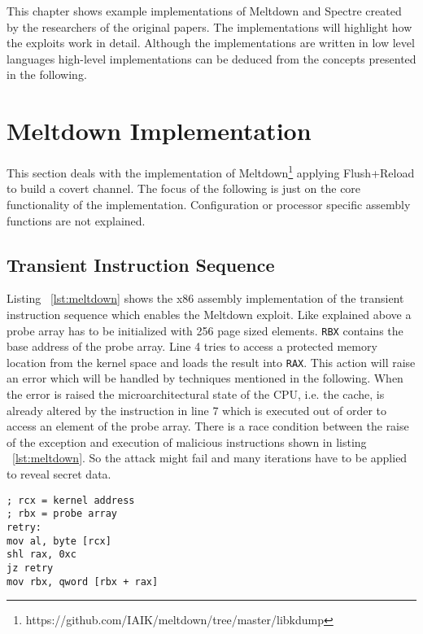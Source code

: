 \documentclass[a4paper,oneside,openright] {scrreprt}
\begin{document}
This chapter shows example implementations of Meltdown and Spectre created by the researchers of the original papers.
The implementations will highlight how the exploits work in detail. Although the implementations are written in low level languages 
high-level implementations can be deduced from the concepts presented in the following.

\section{Meltdown Implementation}
\label{ch:intro:motivation}

This section deals with the implementation of Meltdown\footnote{https://github.com/IAIK/meltdown/tree/master/libkdump} applying
Flush+Reload to build a covert channel. The focus of the following is just on the core functionality of the implementation.
Configuration or processor specific assembly functions are not explained.

\subsection{Transient Instruction Sequence}
\label{ch:TransientInstructionSequence}

Listing ~\ref{lst:meltdown} shows the x86 assembly implementation of the transient instruction sequence
which enables the Meltdown exploit.
Like explained above a probe array has to be initialized with 256 page sized elements.
\texttt{RBX} contains the base address of the probe array.
Line 4 tries to access a protected memory location from the kernel space and loads the result into \texttt{RAX}. 
This action will raise an error which will be handled by techniques mentioned in the following.
When the error is raised the microarchitectural state of the CPU, i.e. the cache, is already altered 
by the instruction in line 7 which is executed out of order to access an element of the probe array.
There is a race condition between the raise of the exception and execution of malicious instructions shown in listing ~\ref{lst:meltdown}.
So the attack might fail and many iterations have to be applied to reveal secret data.

\begin{lstlisting}[language={[x86masm]Assembler}, caption=Meltdown: Transient Instruction Sequence, label={lst:meltdown}]
; rcx = kernel address
; rbx = probe array
retry:
mov al, byte [rcx]
shl rax, 0xc
jz retry
mov rbx, qword [rbx + rax]
\end{lstlisting}
\end{document}
